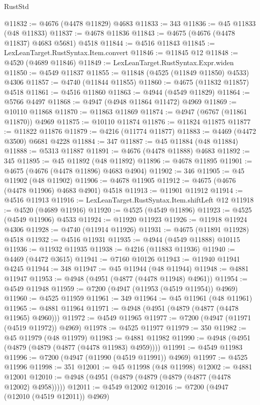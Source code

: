 \begin{lexlean}{RustStd}
\begin{coremodule}
{\begin{coremodule}
{{{{{{{{{{{{{{{{{{{{{{{{{{{{{{{{{{{{{{{{{{{{{{{{{{{{{{{{{{{{@11832 := @4676 (@4478 @11829) @4683
@11833 := 343
@11836 := @45 @11833 (@48 @11833)
@11837 := @4678 @11836
@11843 := @4675 (@4676 (@4478 @11837) @4683 @5681) @4518
@11844 := @4516 @11843
@11845 := LexLeanTarget.RustSyntax.Item.convert
@11846 := @11845 @12
@11848 := @4520 (@4689 @11846)
@11849 := LexLeanTarget.RustSyntax.Expr.widen
@11850 := @4549 @11837
@11855 := @11848 (@4525 (@11849 @11850) @4533) @4306
@11857 := @4740 (@11844 @11855)
@11860 := @4675 (@11832 @11857) @4518
@11861 := @4516 @11860
@11863 := @4944 (@4549 @11829)
@11864 := @5766 @4497
@11868 := @4947 (@4948 @11864 @11472) @4969
@11869 := @10110 @11868
@11870 := @11863 @11869
@11874 := @4947 (@6767 (@11861 @11870)) @4969
@11875 := @10110 @11874
@11876 := @11824 @11875
@11877 := @11822 @11876
@11879 := @4216 (@11774 @11877)
@11883 := @4469 (@4472 @3500) @6681 @4228
@11884 := 347
@11887 := @45 @11884 (@48 @11884)
@11888 := @5313 @11887
@11891 := @4676 (@4478 @11888) @4683
@11892 := 345
@11895 := @45 @11892 (@48 @11892)
@11896 := @4678 @11895
@11901 := @4675 (@4676 (@4478 @11896) @4683 @4904)
@11902 := 346
@11905 := @45 @11902 (@48 @11902)
@11906 := @4678 @11905
@11912 := @4675 (@4676 (@4478 @11906) @4683 @4901) @4518
@11913 := @11901 @11912
@11914 := @4516 @11913
@11916 := LexLeanTarget.RustSyntax.Item.shiftLeft @12
@11918 := @4520 (@4689 @11916)
@11920 := @4525 (@4549 @11896)
@11923 := @4525 (@4549 @11906) @4533
@11924 := @11920 @11923
@11926 := @11918 @11924 @4306
@11928 := @4740 (@11914 @11926)
@11931 := @4675 (@11891 @11928) @4518
@11932 := @4516 @11931
@11935 := @4944 (@4549 @11888) @10115
@11936 := @11932 @11935
@11938 := @4216 (@11883 @11936)
@11940 := @4469 (@4472 @3615)
@11941 := @7160 @10126
@11943 := @11940 @11941 @4245
@11944 := 348
@11947 := @45 @11944 (@48 @11944)
@11948 := @4881 @11947
@11953 := @4948 (@4951 (@4877 (@4478 @11948) @4961))
@11954 := @4549 @11948
@11959 := @7200 (@4947 (@11953 (@4519 @11954)) @4969)
@11960 := @4525 @11959
@11961 := 349
@11964 := @45 @11961 (@48 @11961)
@11965 := @4881 @11964
@11971 := @4948 (@4951 (@4879 (@4877 (@4478 @11965) @4960)))
@11972 := @4549 @11965
@11977 := @7200 (@4947 (@11971 (@4519 @11972)) @4969)
@11978 := @4525 @11977
@11979 := 350
@11982 := @45 @11979 (@48 @11979)
@11983 := @4881 @11982
@11990 := @4948 (@4951 (@4879 (@4879 (@4877 (@4478 @11983) @4959))))
@11991 := @4549 @11983
@11996 := @7200 (@4947 (@11990 (@4519 @11991)) @4969)
@11997 := @4525 @11996
@11998 := 351
@12001 := @45 @11998 (@48 @11998)
@12002 := @4881 @12001
@12010 := @4948 (@4951 (@4879 (@4879 (@4879 (@4877 (@4478 @12002) @4958)))))
@12011 := @4549 @12002
@12016 := @7200 (@4947 (@12010 (@4519 @12011)) @4969)
}}}}}}}}}}}}}}}}}}}}}}}}}}}}}}}}}}}}}}}}}}}}}}}}}}}}}}}}}}}}
\end{coremodule}}
\end{coremodule}
\end{lexlean}
